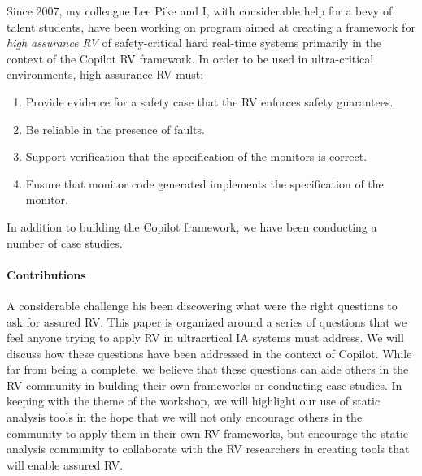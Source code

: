 Since 2007, my colleague Lee Pike and I, with considerable help for a
bevy of talent students, have been working on program aimed at
creating a framework for \emph{high assurance RV} of safety-critical
hard real-time systems primarily in the context of the Copilot RV
framework.  In order to be used in ultra-critical environments,
high-assurance RV must:
\begin{enumerate}
\item \label{req:a} Provide evidence for a safety case that the RV
  enforces safety guarantees.
\item \label{req:d}  Be reliable in the presence of faults.  
\item \label{req:b} Support verification that the specification of the monitors
  is correct.
\item \label{req:c} Ensure that monitor code generated implements the specification of the
monitor.
\end{enumerate} 
In addition to building the Copilot framework, we have
been conducting a number of case studies.


\paragraph{Contributions} 
A considerable challenge his been discovering what were the right
questions to ask for assured RV.  This  paper is organized around a
series of questions that we feel anyone trying to apply RV in
ultracrtical IA systems must address. We will discuss how these
questions have been addressed in the context of Copilot. While far
from being a complete, we  believe
that these questions can aide others in the RV community in building
their own frameworks or conducting case studies. In keeping with the
theme of the workshop, we will highlight our use of static analysis
tools in the hope that we will not only encourage others in the
community to apply them in their own RV frameworks, but encourage the
static analysis community to collaborate with the RV researchers in
creating tools that will enable assured RV.

 






 

